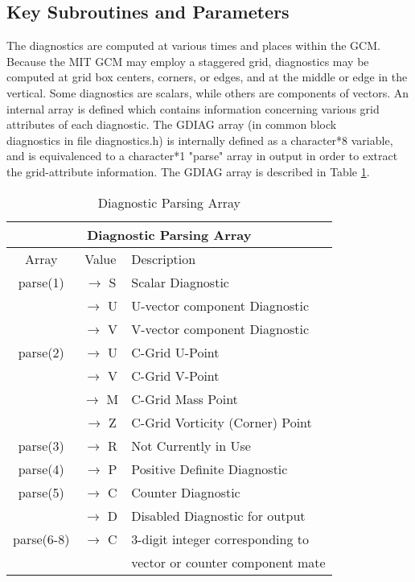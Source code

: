 \subsection{Key Subroutines and Parameters}
\label{sec:diagnostics:diagover}

\noindent
The diagnostics are computed at various times and places within the GCM. Because the
MIT GCM may employ a staggered grid, diagnostics may be computed at grid box centers,
corners, or edges, and at the middle or edge in the vertical. Some diagnostics are scalars, 
while others are components of vectors. An internal array is defined which contains 
information concerning various grid attributes of each diagnostic. The GDIAG
array (in common block \\diagnostics in file diagnostics.h) is internally defined as a 
character*8 variable, and is equivalenced to a character*1 "parse" array in output in 
order to extract the grid-attribute information.  The GDIAG array is described in 
Table \ref{tab:diagnostics:gdiag.tabl}.

\begin{table}
\caption{Diagnostic Parsing Array}
\label{tab:diagnostics:gdiag.tabl}
\begin{center}
\begin{tabular}{ |c|c|l| }
\hline
\multicolumn{3}{|c|}{\bf Diagnostic Parsing Array} \\ 
\hline
\hline
Array & Value & Description \\
\hline
  parse(1)   & $\rightarrow$ S &  Scalar Diagnostic                 \\ 
             & $\rightarrow$ U &  U-vector component Diagnostic     \\ 
             & $\rightarrow$ V &  V-vector component Diagnostic     \\ \hline
  parse(2)   & $\rightarrow$ U &  C-Grid U-Point                    \\ 
             & $\rightarrow$ V &  C-Grid V-Point                    \\ 
             & $\rightarrow$ M &  C-Grid Mass Point                 \\ 
             & $\rightarrow$ Z &  C-Grid Vorticity (Corner) Point   \\ \hline
  parse(3)   & $\rightarrow$ R &  Not Currently in Use              \\ \hline
  parse(4)   & $\rightarrow$ P &  Positive Definite Diagnostic      \\ \hline
  parse(5)   & $\rightarrow$ C &  Counter Diagnostic                \\
             & $\rightarrow$ D &  Disabled Diagnostic for output    \\ \hline
  parse(6-8) & $\rightarrow$ C &  3-digit integer corresponding to  \\
             &                 &  vector or counter component mate  \\ \hline
\end{tabular}
\end{center}
\end{table}


